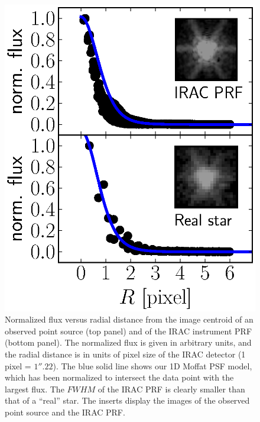 \documentclass[preprint2]{emulateapj}
\begin{document}
\begin{figure}[h]
\begin{center}
\includegraphics[width=1\columnwidth, trim = 220 30 20 20, clip=True]{images/psf.eps}
\caption{Normalized flux versus radial distance 
from the image centroid of an observed point source (top panel) 
and of the IRAC instrument PRF (bottom panel). 
The normalized flux is given in arbitrary units, 
and the radial distance is in units of pixel size of the IRAC detector (1 pixel = $1''.22$).
The blue solid line shows our 1D Moffat PSF model,
which has been normalized to intersect the data point with the largest flux. 
The $FWHM$ of the IRAC PRF is clearly smaller than that of a ``real'' star.
The inserts display the images of the observed point source and the IRAC PRF.}
\label{fig:psf}
\end{center}
\end{figure}
\end{document}
